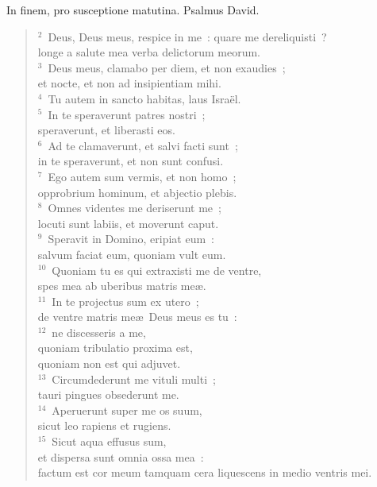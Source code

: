 \lettrine[lines=3,image=true,loversize=0.05,lraise=-0.03]{I}{}n finem, pro susceptione matutina. Psalmus David.
\begin{flushleft}\begin{verse}\vspace{6pt}${}^{2}$~Deus, Deus meus, respice in me~: quare me dereliquisti~?\\ longe a salute mea verba delictorum meorum.\\
${}^{3}$~Deus meus, clamabo per diem, et non exaudies~;\\ et nocte, et non ad insipientiam mihi.\\
${}^{4}$~Tu autem in sancto habitas, laus Isra\"el.\\
${}^{5}$~In te speraverunt patres nostri~;\\ speraverunt, et liberasti eos.\\
${}^{6}$~Ad te clamaverunt, et salvi facti sunt~;\\ in te speraverunt, et non sunt confusi.\\
${}^{7}$~Ego autem sum vermis, et non homo~;\\ opprobrium hominum, et abjectio plebis.\\
${}^{8}$~Omnes videntes me deriserunt me~;\\ locuti sunt labiis, et moverunt caput.\\
${}^{9}$~Speravit in Domino, eripiat eum~:\\ salvum faciat eum, quoniam vult eum.\\
${}^{10}$~Quoniam tu es qui extraxisti me de ventre,\\ spes mea ab uberibus matris me\ae .\\
${}^{11}$~In te projectus sum ex utero~;\\ de ventre matris me\ae\ Deus meus es tu~:\\
${}^{12}$~ne discesseris a me,\\ quoniam tribulatio proxima est,\\ quoniam non est qui adjuvet.\\
${}^{13}$~Circumdederunt me vituli multi~;\\ tauri pingues obsederunt me.\\
${}^{14}$~Aperuerunt super me os suum,\\ sicut leo rapiens et rugiens.\\
${}^{15}$~Sicut aqua effusus sum,\\ et dispersa sunt omnia ossa mea~:\\ factum est cor meum tamquam cera liquescens in medio ventris mei.\\

\end{verse}
\end{flushleft}
